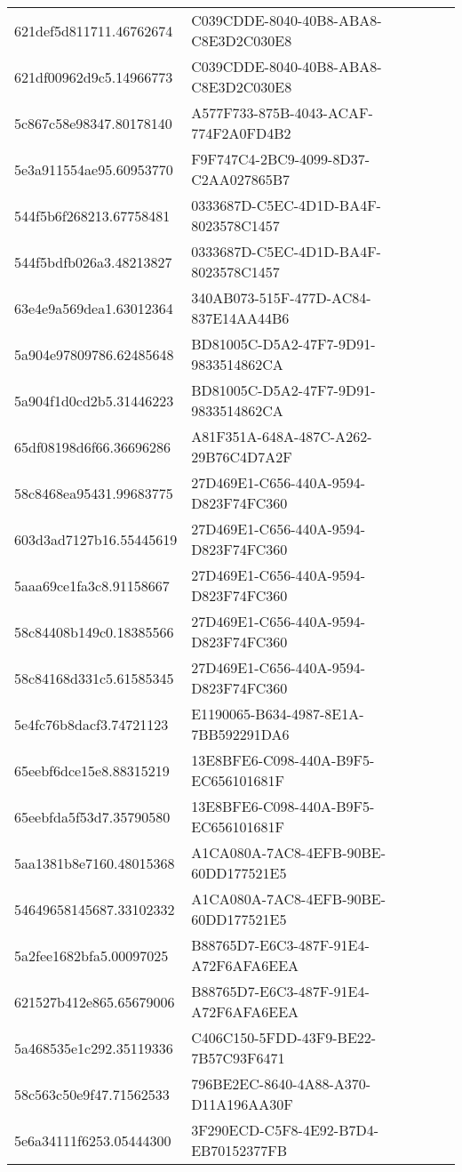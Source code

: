 \begin{tabular}{ll}
621def5d811711.46762674 & C039CDDE-8040-40B8-ABA8-C8E3D2C030E8 \\
621df00962d9c5.14966773 & C039CDDE-8040-40B8-ABA8-C8E3D2C030E8 \\
5c867c58e98347.80178140 & A577F733-875B-4043-ACAF-774F2A0FD4B2 \\
5e3a911554ae95.60953770 & F9F747C4-2BC9-4099-8D37-C2AA027865B7 \\
544f5b6f268213.67758481 & 0333687D-C5EC-4D1D-BA4F-8023578C1457 \\
544f5bdfb026a3.48213827 & 0333687D-C5EC-4D1D-BA4F-8023578C1457 \\
63e4e9a569dea1.63012364 & 340AB073-515F-477D-AC84-837E14AA44B6 \\
5a904e97809786.62485648 & BD81005C-D5A2-47F7-9D91-9833514862CA \\
5a904f1d0cd2b5.31446223 & BD81005C-D5A2-47F7-9D91-9833514862CA \\
65df08198d6f66.36696286 & A81F351A-648A-487C-A262-29B76C4D7A2F \\
58c8468ea95431.99683775 & 27D469E1-C656-440A-9594-D823F74FC360 \\
603d3ad7127b16.55445619 & 27D469E1-C656-440A-9594-D823F74FC360 \\
5aaa69ce1fa3c8.91158667 & 27D469E1-C656-440A-9594-D823F74FC360 \\
58c84408b149c0.18385566 & 27D469E1-C656-440A-9594-D823F74FC360 \\
58c84168d331c5.61585345 & 27D469E1-C656-440A-9594-D823F74FC360 \\
5e4fc76b8dacf3.74721123 & E1190065-B634-4987-8E1A-7BB592291DA6 \\
65eebf6dce15e8.88315219 & 13E8BFE6-C098-440A-B9F5-EC656101681F \\
65eebfda5f53d7.35790580 & 13E8BFE6-C098-440A-B9F5-EC656101681F \\
5aa1381b8e7160.48015368 & A1CA080A-7AC8-4EFB-90BE-60DD177521E5 \\
54649658145687.33102332 & A1CA080A-7AC8-4EFB-90BE-60DD177521E5 \\
5a2fee1682bfa5.00097025 & B88765D7-E6C3-487F-91E4-A72F6AFA6EEA \\
621527b412e865.65679006 & B88765D7-E6C3-487F-91E4-A72F6AFA6EEA \\
5a468535e1c292.35119336 & C406C150-5FDD-43F9-BE22-7B57C93F6471 \\
58c563c50e9f47.71562533 & 796BE2EC-8640-4A88-A370-D11A196AA30F \\
5e6a34111f6253.05444300 & 3F290ECD-C5F8-4E92-B7D4-EB70152377FB \\

\end{tabular}
